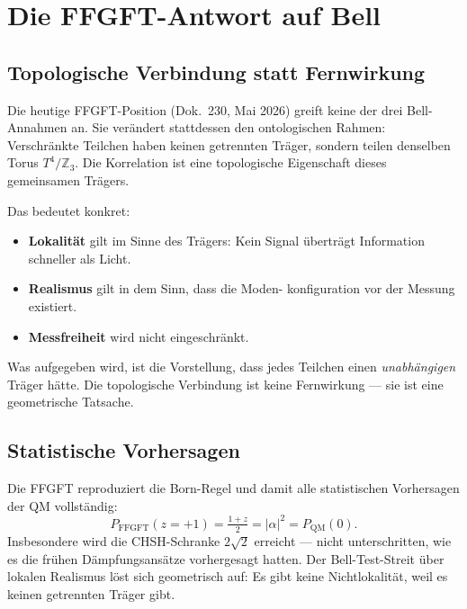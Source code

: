 \chapter{Die FFGFT-Antwort auf Bell}
\label{ch:bell_ffgft}

\section{Topologische Verbindung statt Fernwirkung}

Die heutige FFGFT-Position (Dok.~230, Mai 2026) greift keine der drei
Bell-Annahmen an. Sie verändert stattdessen den ontologischen Rahmen:
Verschränkte Teilchen haben keinen getrennten Träger, sondern teilen
denselben Torus $T^4/\mathbb{Z}_3$. Die Korrelation ist eine
topologische Eigenschaft dieses gemeinsamen Trägers.

Das bedeutet konkret:
\begin{itemize}
  \item \textbf{Lokalität} gilt im Sinne des Trägers: Kein Signal
        überträgt Information schneller als Licht.
  \item \textbf{Realismus} gilt in dem Sinn, dass die Moden-
        konfiguration vor der Messung existiert.
  \item \textbf{Messfreiheit} wird nicht eingeschränkt.
\end{itemize}
Was aufgegeben wird, ist die Vorstellung, dass jedes Teilchen
einen \emph{unabhängigen} Träger hätte. Die topologische Verbindung
ist keine Fernwirkung — sie ist eine geometrische Tatsache.

\section{Statistische Vorhersagen}

Die FFGFT reproduziert die Born-Regel und damit alle statistischen
Vorhersagen der QM vollständig:
\begin{equation}
  P_{\mathrm{FFGFT}}(z=+1) = \tfrac{1+z}{2} = |\alpha|^2 = P_{\mathrm{QM}}(0).
\end{equation}
Insbesondere wird die CHSH-Schranke $2\sqrt2$ erreicht — nicht
unterschritten, wie es die frühen Dämpfungsansätze vorhergesagt
hatten. Der Bell-Test-Streit über lokalen Realismus löst sich
geometrisch auf: Es gibt keine Nichtlokalität, weil es keinen
getrennten Träger gibt.

